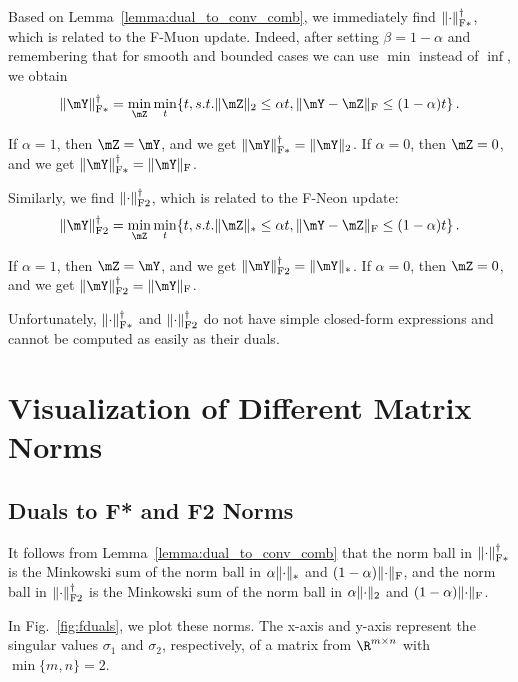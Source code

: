 \documentclass[smallextended,referee,envcountsect]{svjour3}
\DeclarePairedDelimiter{\normf}{\|}{\|_\mathrm{F}}
\DeclarePairedDelimiter{\norms}{\|}{\|_{\mathrm{2}}}
\DeclarePairedDelimiter{\normn}{\|}{\|_{*}}
\DeclarePairedDelimiter{\normfstar}{\|}{\|_\mathrm{F*}}
\DeclarePairedDelimiter{\normftwo}{\|}{\|_\mathrm{F2}}
\newcommand{\figureref}[1]{Fig.~\ref{#1}}
\newcommand{\lemmaref}[1]{Lemma~\ref{#1}}
\begin{document}
 Based on \lemmaref{lemma:dual_to_conv_comb}, we immediately find $\normfstar{\cdot}^\dagger$, which is related to the F-Muon update. Indeed, after setting $\beta=1-\alpha$ and remembering that for smooth and bounded cases we can use $\min$ instead of $\inf$, we obtain
 \begin{equation}\label{eq:normfstardual}
   \normfstar{\mY}^\dagger = \min_{\mZ} \min_t\{t, s.t. \norms{\mZ}\leq \alpha t, \normf{\mY-\mZ}\leq (1-\alpha) t\}\,.
 \end{equation}
 
 If $\alpha = 1$, then $\mZ = \mY$, and we get $\normfstar{\mY}^\dagger = \norms{\mY}$. If $\alpha = 0$, then $\mZ = 0$, and we get $\normfstar{\mY}^\dagger = \normf{\mY}$.
 
 Similarly, we find $\normftwo{\cdot}^\dagger$, which is related to the F-Neon update:
 \begin{equation}\label{eq:normftwodual}
   \normftwo{\mY}^\dagger = \min_{\mZ} \min_t\{t, s.t. \normn{\mZ}\leq \alpha t, \normf{\mY-\mZ}\leq (1-\alpha) t\}\,.
 \end{equation}
 
 If $\alpha = 1$, then $\mZ = \mY$, and we get $\normftwo{\mY}^\dagger = \normn{\mY}$. If $\alpha = 0$, then $\mZ = 0$, and we get $\normftwo{\mY}^\dagger = \normf{\mY}$.
 
 Unfortunately, $\normfstar{\cdot}^\dagger$ and $\normftwo{\cdot}^\dagger$ do not have simple closed-form expressions and cannot be computed as easily as their duals.
 
 \section{Visualization of Different Matrix Norms}
 \subsection{Duals to F* and F2 Norms}
 
 It follows from \lemmaref{lemma:dual_to_conv_comb} that the norm ball in $\normfstar{\cdot}^\dagger$ is the Minkowski sum of the norm ball in $\alpha\normn{\cdot}$ and $(1-\alpha)\normf{\cdot}$, and the norm ball in $\normftwo{\cdot}^\dagger$ is the Minkowski sum of the norm ball in $\alpha\norms{\cdot}$ and $(1-\alpha)\normf{\cdot}$.
 
 In \figureref{fig:fduals}, we plot these norms. The x-axis and y-axis represent the singular values $\sigma_1$ and $\sigma_2$, respectively, of a matrix from $\R^{m\times n}$ with $\min\{m,n\}=2$.
 
\end{document}
